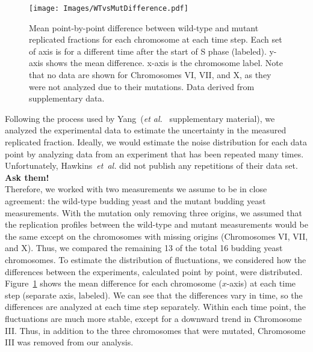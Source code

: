 		\begin{figure}[tbh]
			\begin{center}
				\texttt{[image: Images/WTvsMutDifference.pdf]}
			\end{center}
				\caption[Estimating Experimental Noise A]{\label{fig:MeanDifference} Mean point-by-point difference between wild-type and mutant replicated fractions for each chromosome at each time step.
					Each set of axis is for a different time after the start of S phase (labeled).
					y-axis shows the mean difference.
					x-axis is the chromosome label.
					Note that no data are shown for Chromosomes VI, VII, and X, as they were not analyzed due to their mutations.
					Data derived from~\cite{StochasticTermination} supplementary data.
				}
		\end{figure}
		
		Following the process used by Yang~(\emph{et al.}~\cite{ScottsPaper} supplementary material), we analyzed the experimental data to estimate the uncertainty in the measured replicated fraction.
		Ideally, we would estimate the noise distribution for each data point by analyzing data from an experiment that has been repeated many times.
		Unfortunately, Hawkins~\emph{et~al.} did not publish any repetitions of their data set.\\
		\textbf{Ask them!}\\
		Therefore, we worked with two measurements we assume to be in close agreement: the wild-type budding yeast and the mutant budding yeast measurements.
		With the mutation only removing three origins, we assumed that the replication profiles between the wild-type and mutant measurements would be the same except on the chromosomes with missing origins (Chromosomes VI, VII, and X).
		Thus, we compared the remaining 13 of the total 16 budding yeast chromosomes.
		To estimate the distribution of fluctuations, we considered how the differences between the experiments, calculated point by point, were distributed.
		Figure~\ref{fig:MeanDifference} shows the mean difference for each chromosome ($x$-axis) at each time step (separate axis, labeled).
		We can see that the differences vary in time, so the differences are analyzed at each time step separately.
		Within each time point, the fluctuations are much more stable, except for a downward trend in Chromosome III.
		Thus, in addition to the three chromosomes that were mutated, Chromosome III was removed from our analysis.
		
